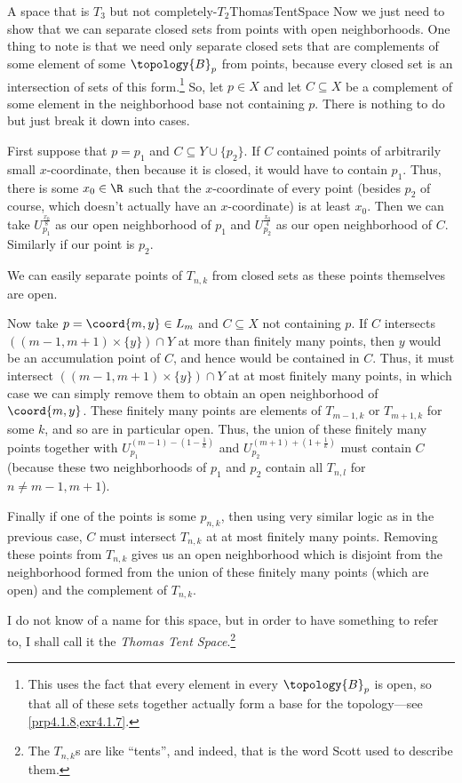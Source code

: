 \begin{exm}{A space that is $T_3$ but not completely-$T_2$}{ThomasTentSpace}
Now we just need to show that we can separate closed sets from points with open neighborhoods.  One thing to note is that we need only separate closed sets that are complements of some element of some $\topology{B}_p$ from points, because every closed set is an intersection of sets of this form.\footnote{This uses the fact that every element in every $\topology{B}_p$ is open, so that all of these sets together actually form a base for the topology---see \cref{prp4.1.8,exr4.1.7}.}  So, let $p\in X$ and let $C\subseteq X$ be a complement of some element in the neighborhood base not containing $p$.  There is nothing to do but just break it down into cases.

First suppose that $p=p_1$ and $C\subseteq Y\cup \{ p_2\}$.  If $C$ contained points of arbitrarily small $x$-coordinate, then because it is closed, it would have to contain $p_1$.  Thus, there is some $x_0\in \R$ such that the $x$-coordinate of every point (besides $p_2$ of course, which doesn't actually have an $x$-coordinate) is at least $x_0$.  Then we can take $U_{p_1}^{\frac{x_0}{8}}$ as our open neighborhood of $p_1$ and $U_{p_2}^{\frac{x_0}{4}}$ as our open neighborhood of $C$.  Similarly if our point is $p_2$.

We can easily separate points of $T_{n,k}$ from closed sets as these points themselves are open.

Now take $p=\coord{m,y}\in L_m$ and $C\subseteq X$ not containing $p$.  If $C$ intersects $((m-1,m+1)\times \{ y\} )\cap Y$ at more than finitely many points, then $y$ would be an accumulation point of $C$, and hence would be contained in $C$.  Thus, it must intersect $((m-1,m+1)\times \{ y\})\cap Y$ at at most finitely many points, in which case we can simply remove them to obtain an open neighborhood of $\coord{m,y}$.  These finitely many points are elements of $T_{m-1,k}$ or $T_{m+1,k}$ for some $k$, and so are in particular open.  Thus, the union of these finitely many points together with $U_{p_1}^{(m-1)-(1-\frac{1}{k})}$ and $U_{p_2}^{(m+1)+(1+\frac{1}{k})}$ must contain $C$ (because these two neighborhoods of $p_1$ and $p_2$ contain all $T_{n,l}$ for $n\neq m-1,m+1$).

Finally if one of the points is some $p_{n,k}$, then using very similar logic as in the previous case, $C$ must intersect $T_{n,k}$ at at most finitely many points.  Removing these points from $T_{n,k}$ gives us an open neighborhood which is disjoint from the neighborhood formed from the union of these finitely many points (which are open) and the complement of $T_{n,k}$.
\begin{rmk}
I do not know of a name for this space, but in order to have something to refer to, I shall call it the \emph{Thomas Tent Space}.\footnote{The $T_{n,k}$s are like ``tents'', and indeed, that is the word Scott used to describe them.}
\end{rmk}
\end{exm}

